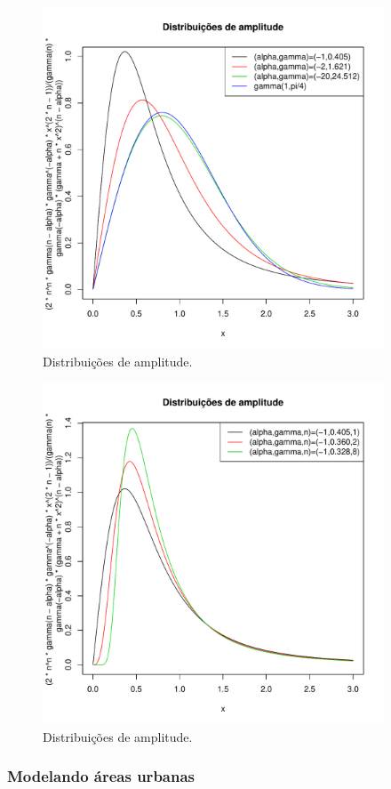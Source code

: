 \documentclass[12pt,a4paper]{article}
\begin{document}
\begin{figure}[!htb]
\centering
\includegraphics[width=4.0in]{fig_eq_ga_fig1_frery_muller_1997.pdf}
	\caption{Distribuições de amplitude.}
\label{sec64fig1}
\end{figure}

\begin{figure}[!htb]
\centering
\includegraphics[width=4.0in]{fig_eq_ga_fig2_frery_muller_1997.pdf}
	\caption{Distribuições de amplitude.}
\label{sec64fig2}
\end{figure}

\subsubsection{Modelando áreas urbanas}
\end{document}

